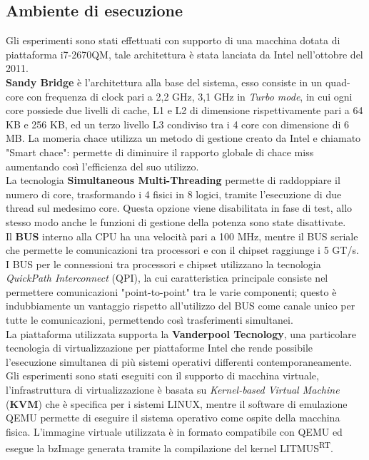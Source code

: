 \newpage

\subsection{Ambiente di esecuzione}
\label{sec:ambiente}

\noindent Gli esperimenti sono stati effettuati con supporto di una macchina dotata di piattaforma i7-2670QM, tale architettura è stata lanciata da Intel nell'ottobre del 2011.\\
\textbf{Sandy Bridge} è l'architettura alla base del sistema, esso consiste in un quad-core con frequenza di clock pari a 2,2 GHz, 3,1 GHz in \textit{Turbo mode}, in cui ogni core possiede due livelli di cache, L1 e L2 di dimensione rispettivamente pari a 64 KB e 256 KB, ed un terzo livello L3 condiviso tra i 4 core con dimensione di 6 MB. La momeria chace utilizza un metodo di gestione creato da Intel e chiamato "Smart chace": permette di diminuire il rapporto globale di chace miss aumentando così l'efficienza del suo utilizzo.\\
La tecnologia \textbf{Simultaneous Multi-Threading} permette di raddoppiare il numero di core, trasformando i 4 fisici in 8 logici, tramite l'esecuzione di due thread sul medesimo core. Questa opzione viene disabilitata in fase di test, allo stesso modo anche le funzioni di gestione della potenza sono state disattivate.\\
Il \textbf{BUS} interno alla CPU ha una velocità pari a 100 MHz, mentre il BUS seriale che permette le comunicazioni tra processori e con il chipset raggiunge i 5 GT/s. I BUS per le connessioni tra processori e chipset utilizzano la tecnologia \textit{QuickPath Interconnect} (QPI), la cui caratteristica principale consiste nel permettere comunicazioni "point-to-point" tra le varie componenti; questo è indubbiamente un vantaggio rispetto all'utilizzo del BUS come canale unico per tutte le comunicazioni, permettendo così trasferimenti simultanei.\\
La piattaforma utilizzata supporta la \textbf{Vanderpool Tecnology}, una particolare tecnologia di virtualizzazione per piattaforme Intel che rende possibile l'esecuzione simultanea di più sistemi operativi differenti contemporaneamente.\\

\noindent Gli esperimenti sono stati eseguiti con il supporto di macchina virtuale, l'infrastruttura di virtualizzazione è basata su \textit{Kernel-based Virtual Machine} (\textbf{KVM}) che è specifica per i sistemi LINUX, mentre il software di emulazione QEMU permette di eseguire il sistema operativo come ospite della macchina fisica. L'immagine virtuale utilizzata è in formato compatibile con QEMU ed esegue la bzImage generata tramite la compilazione del kernel LITMUS\textsuperscript{RT}.\\

